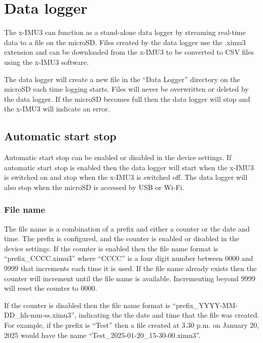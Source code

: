 \section{Data logger}
\label{sec:dataLogger}

The x-IMU3 can function as a stand-alone data logger by streaming real-time data to a file on the \ac{microSD}.  Files created by the data logger use the .ximu3 extension and can be downloaded from the x-IMU3 to be converted to \ac{CSV} files using the x-IMU3 software.

The data logger will create a new file in the \enquote{Data Logger} directory on the \ac{microSD} each time logging starts.  Files will never be overwritten or deleted by the data logger.  If the \ac{microSD} becomes full then the data logger will stop and the x-IMU3 will indicate an error.

\subsection{Automatic start stop}
\label{sec:automaticStartStop}

Automatic start stop can be enabled or disabled in the device settings.  If automatic start stop is enabled then the data logger will start when the x-IMU3 is switched on and stop when the x-IMU3 is switched off.  The data logger will also stop when the \ac{microSD} is accessed by \ac{USB} or Wi-Fi.

\subsubsection{File name}
\label{sec:fileName}

The file name is a combination of a prefix and either a counter or the date and time. The prefix is configured, and the counter is enabled or disabled in the device settings.  If the counter is enabled then the file name format is \enquote{prefix\_CCCC.ximu3} where \enquote{CCCC} is a four digit number between 0000 and 9999 that increments each time it is used.  If the file name already exists then the counter will increment until the file name is available.  Incrementing beyond 9999 will reset the counter to 0000.

If the counter is disabled then the file name format is \enquote{prefix\_YYYY-MM-DD\_hh-mm-ss.ximu3}, indicating the the date and time that the file was created.  For example, if the prefix is \enquote{Test} then a file created at 3.30 p.m. on January 20, 2025 would have the name \enquote{Test\_2025-01-20\_15-30-00.ximu3}.

